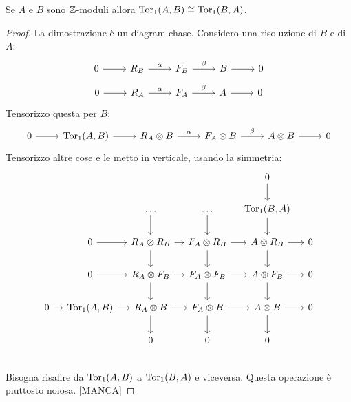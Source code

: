 \begin{proposition}
  Se $ A $ e $ B $ sono $ \mathbb{Z} $-moduli allora $ \mathrm{Tor_1}( A,B) \cong \mathrm{Tor_1}( B,A) $.
\end{proposition}
\begin{proof}
  La dimostrazione è un diagram chase.
  Considero una risoluzione di $ B $ e di $ A $:
  \[
    \begin{tikzcd}
      0 \rar{} & R_B \rar{\alpha} & F_B \rar{\beta} & B \rar & 0
    \end{tikzcd}
  \]
  \[
    \begin{tikzcd}
      0 \rar{} & R_A \rar{\alpha} & F_A \rar{\beta} & A \rar & 0
    \end{tikzcd}
  \]
  Tensorizzo questa per $ B $:
  \[
    \begin{tikzcd}
      0 \rar{} & \tor{A,B} \rar & R_A \otimes B \rar{\alpha} & F_A \otimes B \rar{\beta} & A \otimes B \rar & 0
    \end{tikzcd}
  \]
  Tensorizzo altre cose e le metto in verticale, usando la simmetria:
  \[
    \begin{tikzcd}[nodes={column sep= 10 pt}]
      {} & {} & {} & {} & 0 \dar & {} \\
      {} & {} & \dots \dar & \dots \dar & \tor{B,A} \dar & {} \\
      {} & 0 \rar & R_A \otimes R_B \rar \dar & F_A \otimes R_B \dar \rar & A \otimes R_B \dar  \rar & 0 \\
      {} & 0 \rar & R_A \otimes F_B \rar \dar & F_A \otimes F_B \dar \rar & A \otimes F_B \dar  \rar & 0 \\
      0 \rar & \tor{A,B} \rar & R_A \otimes B \rar \dar & F_A \otimes B \rar \dar & A \otimes B  \rar \dar & 0 \\
      {} & {} & 0 & 0 & 0 & {} \\
    \end{tikzcd}
  \]
  Bisogna risalire da $ \mathrm{Tor_1}( A,B) $ a $ \mathrm{Tor_1}( B,A) $ e viceversa. Questa operazione è piuttosto
  noiosa. [MANCA]
\end{proof}

